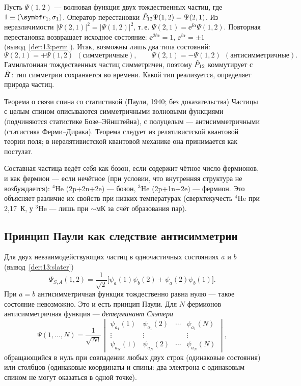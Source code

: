 Пусть $\Psi(1,2)$ — волновая функция двух тождественных частиц, где $1\equiv(\vect r_1,\sigma_1)$. Оператор
перестановки $\hat{P}_{12}\Psi(1,2)=\Psi(2,1)$. Из неразличимости $|\Psi(2,1)|^2=|\Psi(1,2)|^2$, т.\,е.
$\Psi(2,1)=\ee^{\ii\alpha}\Psi(1,2)$. Повторная перестановка возвращает исходное состояние:
$\ee^{2\ii\alpha}=1$, $\ee^{\ii\alpha}=\pm1$ (вывод~\ref{der:13:perm}). Итак, возможны лишь два типа состояний:
\begin{equation}\label{eq:13:sym}
  \Psi(2,1)=+\Psi(1,2)\ \ (\text{симметричные}),\qquad \Psi(2,1)=-\Psi(1,2)\ \ (\text{антисимметричные}).
\end{equation}
Гамильтониан тождественных частиц симметричен, поэтому $\hat{P}_{12}$ коммутирует с $\hat{H}$: тип симметрии
сохраняется во времени. Какой тип реализуется, определяет природа частиц.

\begin{principle}{Теорема о связи спина со статистикой (Паули, 1940; без доказательства)}
Частицы с целым спином описываются симметричными волновыми функциями (подчиняются статистике
Бозе--Эйнштейна), с полуцелым — антисимметричными (статистика Ферми--Дирака). Теорема следует из
релятивистской квантовой теории поля; в нерелятивистской квантовой механике она принимается как постулат.
\end{principle}

Составная частица ведёт себя как бозон, если содержит чётное число фермионов, и как фермион — если нечётное
(при условии, что внутренняя структура не возбуждается): $^4$He (2p+2n+2e) — бозон, $^3$He (2p+1n+2e) — фермион.
Это объясняет различие их свойств при низких температурах (сверхтекучесть $^4$He при 2,17~К, у $^3$He — лишь
при $\sim$мК за счёт образования пар).

\subsection{Принцип Паули как следствие антисимметрии}

Для двух невзаимодействующих частиц в одночастичных состояниях $a$ и $b$ (вывод~\ref{der:13:slater})
\begin{equation}\label{eq:13:2p}
  \Psi_{S,A}(1,2)=\frac{1}{\sqrt2}\bigl[\psi_a(1)\psi_b(2)\pm\psi_a(2)\psi_b(1)\bigr].
\end{equation}
При $a=b$ антисимметричная функция тождественно равна нулю — такое состояние невозможно. Это и есть
принцип Паули. Для $N$ фермионов антисимметричная функция — \emph{детерминант Слэтера}
\begin{equation}\label{eq:13:slater}
  \Psi(1,\dots,N)=\frac{1}{\sqrt{N!}}
  \begin{vmatrix}
   \psi_{a_1}(1)&\psi_{a_1}(2)&\cdots&\psi_{a_1}(N)\\
   \vdots&\vdots&&\vdots\\
   \psi_{a_N}(1)&\psi_{a_N}(2)&\cdots&\psi_{a_N}(N)
  \end{vmatrix},
\end{equation}
обращающийся в нуль при совпадении любых двух строк (одинаковые состояния) или столбцов (одинаковые
координаты и спины: два электрона с одинаковым спином не могут оказаться в одной точке).

